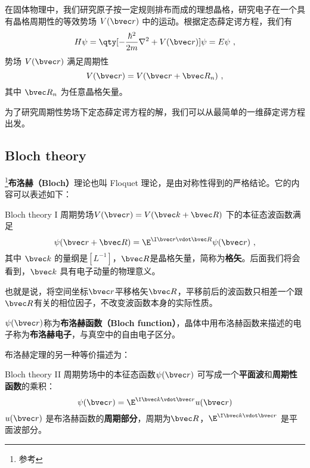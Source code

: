 
\begin{issues}
\issueDraft
\end{issues}


在固体物理中，我们研究原子按一定规则排布而成的理想晶格，研究电子在一个具有晶格周期性的等效势场 $V(\bvec r)$ 中的运动。根据定态薛定谔方程，我们有
\begin{equation}\label{eq_Bloch_4}
H\psi=\qty[-\frac{\hbar^2}{2m}\nabla^2+V(\bvec r)] \psi = E\psi~,
\end{equation}
势场 $V(\bvec r)$ 满足周期性
\begin{equation}
V(\bvec r)=V(\bvec r+\bvec R_n)~,
\end{equation}
其中 $\bvec R_n$ 为任意晶格矢量。

为了研究周期性势场下定态薛定谔方程的解，我们可以从最简单的一维薛定谔方程出发。

\subsection{Bloch theory}
\footnote{参考\cite{GriffQ}}\textbf{布洛赫（Bloch）}理论也叫 Floquet 理论，是由对称性得到的严格结论。它的内容可以表述如下：

\begin{theorem}{Bloch theory I}
周期势场$V(\bvec r) = V(\bvec k + \bvec R)$ 下的本征态波函数满足
\begin{equation}\label{eq_Bloch_1}
\psi(\bvec r + \bvec R) = \E^{\I \bvec r \vdot \bvec R}\psi(\bvec r)~,
\end{equation}
其中 $\bvec k$ 的量纲是$[L^{-1}]$，$\bvec R$是晶格矢量，简称为\textbf{格矢}。后面我们将会看到，$\bvec k$ 具有电子动量的物理意义。 
\end{theorem} 

也就是说，将空间坐标$\bvec r$平移格矢$\bvec R$，平移前后的波函数只相差一个跟$\bvec R$有关的相位因子，不改变波函数本身的实际性质。

$\psi (\bvec r)$称为\textbf{布洛赫函数（Bloch function）}，晶体中用布洛赫函数来描述的电子称为\textbf{布洛赫电子}，与真空中的自由电子区分。

布洛赫定理的另一种等价描述为：

\begin{theorem}{Bloch theory II}
周期势场中的本征态函数$\psi(\bvec r)$ 可写成一个\textbf{平面波}和\textbf{周期性函数}的乘积：
\begin{equation}\label{eq_Bloch_2}
\psi(\bvec r) = \E^{\I \bvec k \vdot \bvec r} u(\bvec r)
\end{equation}
$u( \bvec r)$ 是布洛赫函数的\textbf{周期部分}，周期为$\bvec R$，$\E^{\I \bvec k \vdot \bvec r}$ 是平面波部分。
\end{theorem}


